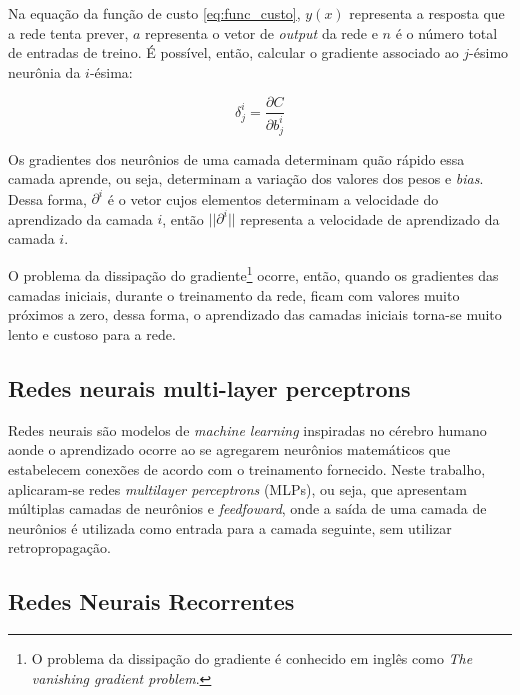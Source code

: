 Na equação da função de custo \ref{eq:func_custo}, $y(x)$ representa a resposta
que a rede tenta prever, $a$ representa o vetor de \textit{output} da rede e 
$n$ é o número total de entradas de treino. É possível, então, calcular o gradiente
associado ao $j$-ésimo neurônia da $i$-ésima:

\begin{equation}
  \delta_j^i = \frac{\partial C}{\partial b_j^i}
\label{eq:func_grad}
\end{equation}

Os gradientes dos neurônios de uma camada determinam quão rápido essa camada
aprende, ou seja, determinam a variação dos valores dos pesos e \textit{bias}.
Dessa forma, $\partial^i$ é o vetor cujos elementos determinam a velocidade
do aprendizado da camada $i$, então $||\partial^i||$ representa a velocidade
de aprendizado da camada $i$.

O problema da dissipação do gradiente\footnote{O problema da dissipação do gradiente 
é conhecido em inglês como \textit{The vanishing gradient problem}.
} ocorre, então, quando os gradientes das camadas iniciais, durante o treinamento
da rede, ficam com valores muito próximos a zero, dessa forma, o aprendizado das 
camadas iniciais torna-se muito lento e custoso para a rede.


\subsection{Redes neurais multi-layer perceptrons}
Redes neurais são modelos de \textit{machine learning} 
inspiradas no cérebro humano aonde o aprendizado ocorre 
ao se agregarem neurônios matemáticos que 
estabelecem conexões de acordo com o treinamento fornecido. 
Neste trabalho, aplicaram-se redes 
\textit{multilayer perceptrons} (MLPs), ou seja, que 
apresentam múltiplas camadas de neurônios 
e \textit{feedfoward}, onde a saída de 
uma camada de neurônios é utilizada como entrada para a camada seguinte, sem utilizar retropropagação.
          
        
\subsection{Redes Neurais Recorrentes}
\label{rnn}

